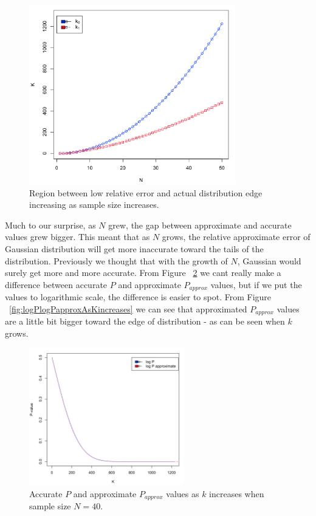 \documentclass[12pt]{article}
\begin{document}
{\begin{figure}[H]
	\centering
  \includegraphics[width=0.8\textwidth]{T0vsN}
	\caption{Region between low relative error and actual distribution edge increasing as sample size increases.}
	\label{fig:T0vsN}
\end{figure}

Much to our surprise, as $N$ grew, the gap between approximate and accurate values grew bigger. This meant that as $N$ grows, the relative approximate error of Gaussian distribution will get more inaccurate toward the tails of the distribution. Previously we thought that with the growth of $N$, Gaussian would surely get more and more accurate.
From Figure ~\ref{fig:PandPapproxAsKincreases} we cant really make a difference between accurate $P$ and approximate $P_{approx}$ values, but if we put the values to logarithmic scale, the difference is easier to spot. From Figure ~\ref{fig:logPlogPapproxAsKincreases} we can see that approximated $P_{approx}$ values are a little bit bigger toward the edge of distribution - as can be seen when $k$ grows.

\begin{figure}[H]
  \centering
  \includegraphics[width=0.6\textwidth]{PandPapproxAsKincreases}
  \caption{Accurate $P$ and approximate $P_{approx}$ values as $k$ increases when sample size $N=40$.}
  \label{fig:PandPapproxAsKincreases}
\end{figure}

}
\end{document}
